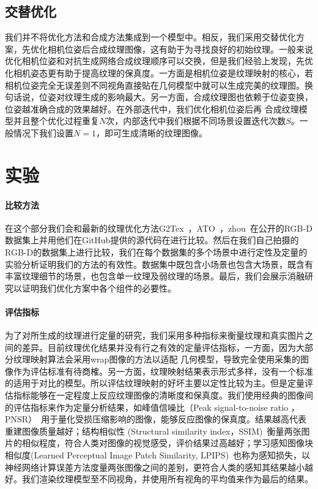 \subsection{交替优化}
我们并不将优化方法和合成方法集成到一个模型中。相反，我们采用交替优化方案，先优化相机位姿后合成纹理图像，这有助于为寻找良好的初始纹理。一般来说优化相机位姿和对抗生成网络合成纹理顺序可以交换，但是我们经验上发现，先优化相机姿态更有助于提高纹理的保真度。一方面是相机位姿是纹理映射的核心，若相机位姿完全无误差则不同视角直接贴在几何模型中就可以生成完美的纹理图。换句话说，位姿对纹理生成的影响最大。另一方面，合成纹理图也依赖于位姿变换，位姿越准确合成的效果越好。在外部迭代中，我们优化相机位姿后再
合成纹理模型并且整个优化过程重复$N$次，内部迭代中我们根据不同场景设置迭代次数$S$。一般情况下我们设置$N = 1$，即可生成清晰的纹理图像。


\section{实验}
\paragraph*{比较方法}
在这个部分我们会和最新的纹理优化方法G2Tex~\cite{fu2018texture}，ATO~\cite{JingweiHuang2020AdversarialTO}，zhou~\cite{zhou2014color}在公开的RGB-D数据集上并用他们在GitHub提供的源代码在进行比较。然后在我们自己拍摄的RGB-D的数据集上进行比较，我们在每个数据集的多个场景中进行定性及定量的实验分析证明我们的方法的有效性。数据集中既包含小场景也包含大场景，既含有丰富纹理细节的场景，也包含单一纹理及弱纹理的场景。最后，我们会展示消融研究以证明我们优化方案中各个组件的必要性。\par

\paragraph*{评估指标}

为了对所生成的纹理进行定量的研究，我们采用多种指标来衡量纹理和真实图片之间的差异。目前纹理优化结果并没有行之有效的定量评估指标，一方面，因为大部分纹理映射算法会采用wrap图像的方法以适配
几何模型，导致完全使用采集的图像作为评估标准有待商榷。另一方面，纹理映射结果表示形式多样，没有一个标准的适用于对比的模型。所以评估纹理映射的好坏主要以定性比较为主。但是定量评估指标能够在一定程度上反应纹理图像的清晰度和保真度。我们使用经典的图像间的评估指标来作为定量分析结果，如峰值信噪比（Peak signal-to-noise ratio ，PNSR）~\cite{de2003improved}用于量化受损压缩影响的图像，能够反应图像的保真度。结果越高代表重建图像质量越好；结构相似性 (Structural similarity index，SSIM)~\cite{brunet2011mathematical}衡量两张图片的相似程度，符合人类对图像的视觉感受，评价结果过高越好；学习感知图像块相似度(Learned Perceptual Image Patch Similarity, LPIPS)~\cite{zhang2018unreasonable}也称为感知损失，以神经网络计算误差方法度量两张图像之间的差别，更符合人类的感知其结果越小越好。我们渲染纹理模型至不同视角，并使用所有视角的平均值来作为最后的结果。


